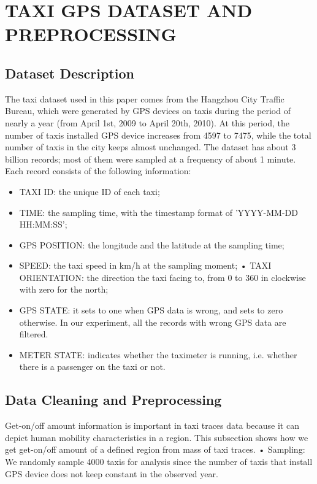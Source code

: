 \documentclass[a4paper, 10pt, conference]{ieeeconf}      %
\begin{document}
\section{TAXI GPS DATASET AND PREPROCESSING}%

\subsection{Dataset Description} The taxi dataset used in this paper comes from the Hangzhou City Traffic Bureau, which were generated by GPS devices on taxis during the period of nearly a year (from April 1st, 2009 to April 20th, 2010). At this period, the number of taxis installed GPS device increases from 4597 to 7475, while the total number of taxis in the city keeps almost unchanged. The dataset has about 3 billion records; most of them were sampled at a frequency of about 1 minute. Each record consists of the following information:

\begin{itemize}

\item TAXI ID: the unique ID of each taxi;
\item TIME: the sampling time, with the timestamp format of ’YYYY-MM-DD HH:MM:SS’;
\item GPS POSITION: the longitude and the latitude at the sampling time;
\item SPEED: the taxi speed in km/h at the sampling moment; • TAXI ORIENTATION: the direction the taxi facing to, from 0 to 360 in clockwise with zero for the north;
\item GPS STATE: it sets to one when GPS data is wrong, and sets to zero otherwise. In our experiment, all the records with wrong GPS data are filtered.
\item METER STATE: indicates whether the taximeter is running, i.e. whether there is a passenger on the taxi or not.

\end{itemize}

\subsection{Data Cleaning and Preprocessing}Get-on/off amount information is important in taxi traces data because it can depict human mobility characteristics in a region. This subsection shows how we get get-on/off amount of a defined region from mass of taxi traces. • Sampling: We randomly sample 4000 taxis for analysis since the number of taxis that install GPS device does not keep constant in the observed year.
\end{document}
